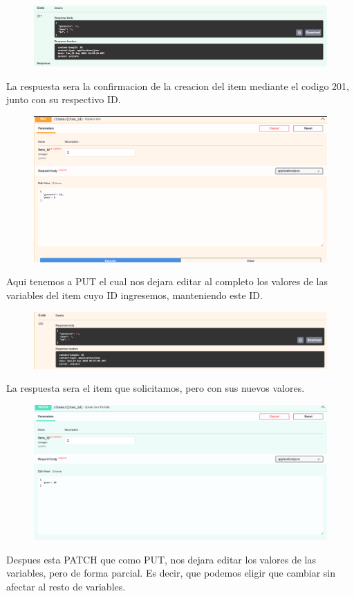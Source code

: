 \documentclass[12pt]{article}
\begin{document}
\begin{figure}[H]
    \centering
    \includegraphics[width=1\textwidth]{Imagenes/POST2.png}
\end{figure}
La respuesta sera la confirmacion de la creacion del item mediante el codigo 201, junto con su respectivo ID.

\begin{figure}[H]
    \centering
    \includegraphics[width=1\textwidth]{Imagenes/PUT1.png}
\end{figure}
Aqui tenemos a PUT el cual nos dejara editar al completo los valores de las variables del item cuyo ID ingresemos, manteniendo este ID.

\begin{figure}[H]
    \centering
    \includegraphics[width=1\textwidth]{Imagenes/PUT2.png}
\end{figure}
La respuesta sera el item que solicitamos, pero con sus nuevos valores.

\begin{figure}[H]
    \centering
    \includegraphics[width=1\textwidth]{Imagenes/PATCH1.png}
\end{figure}
Despues esta PATCH que como PUT, nos dejara editar los valores de las variables, pero de forma parcial. Es decir, que podemos eligir que cambiar sin afectar al resto de variables.
\end{document}
